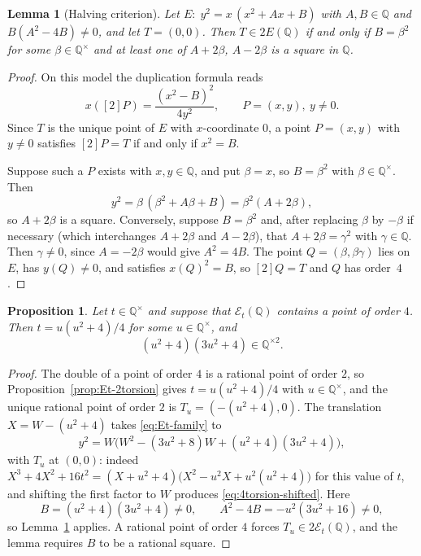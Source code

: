 \documentclass[11pt,a4paper]{amsart}
\newtheorem{proposition}[theorem]{Proposition}
\newtheorem{lemma}[theorem]{Lemma}
\theoremstyle{definition}
\theoremstyle{remark}
\numberwithin{equation}{section}
\newcommand{\Q}{\mathbb{Q}}
\newcommand{\mathcalE}{\mathcal{E}}
\begin{document}
\begin{lemma}[Halving criterion]\label{lem:halving}
Let $E:\;y^2=x\,(x^2+Ax+B)$ with $A,B\in\Q$ and $B(A^2-4B)\neq0$, and let $T=(0,0)$. Then $T\in2E(\Q)$ if and only if $B=\beta^2$ for some $\beta\in\Q^\times$ and at least one of $A+2\beta$, $A-2\beta$ is a square in $\Q$.
\end{lemma}

\begin{proof}
On this model the duplication formula reads
\[
x([2]P)=\frac{(x^2-B)^2}{4y^2},\qquad P=(x,y),\ y\neq0.
\]
Since $T$ is the unique point of $E$ with $x$-coordinate $0$, a point $P=(x,y)$ with $y\neq0$ satisfies $[2]P=T$ if and only if $x^2=B$.

Suppose such a $P$ exists with $x,y\in\Q$, and put $\beta=x$, so $B=\beta^2$ with $\beta\in\Q^\times$. Then
\[
y^2=\beta\,(\beta^2+A\beta+B)=\beta^2(A+2\beta),
\]
so $A+2\beta$ is a square. Conversely, suppose $B=\beta^2$ and, after replacing $\beta$ by $-\beta$ if necessary (which interchanges $A+2\beta$ and $A-2\beta$), that $A+2\beta=\gamma^2$ with $\gamma\in\Q$. Then $\gamma\neq0$, since $A=-2\beta$ would give $A^2=4B$. The point $Q=(\beta,\beta\gamma)$ lies on $E$, has $y(Q)\neq0$, and satisfies $x(Q)^2=B$, so $[2]Q=T$ and $Q$ has order~$4$.\hspace*{1em}
\end{proof}

\begin{proposition}\label{prop:4torsion-reduction}
Let $t\in\Q^\times$ and suppose that $\mathcalE_t(\Q)$ contains a point of order $4$. Then $t=u(u^2+4)/4$ for some $u\in\Q^\times$, and
\begin{equation}\label{eq:4torsion-B-square}
(u^2+4)(3u^2+4)\in\Q^{\times2}.
\end{equation}
\end{proposition}

\begin{proof}
The double of a point of order $4$ is a rational point of order $2$, so Proposition~\ref{prop:Et-2torsion} gives $t=u(u^2+4)/4$ with $u\in\Q^\times$, and the unique rational point of order $2$ is $T_u=(-(u^2+4),0)$. The translation $X=W-(u^2+4)$ takes \eqref{eq:Et-family} to
\begin{equation}\label{eq:4torsion-shifted}
y^2=W\bigl(W^2-(3u^2+8)W+(u^2+4)(3u^2+4)\bigr),
\end{equation}
with $T_u$ at $(0,0)$: indeed $X^3+4X^2+16t^2=(X+u^2+4)\bigl(X^2-u^2X+u^2(u^2+4)\bigr)$ for this value of $t$, and shifting the first factor to $W$ produces \eqref{eq:4torsion-shifted}. Here
\[
B=(u^2+4)(3u^2+4)\neq0,
\qquad A^2-4B=-u^2(3u^2+16)\neq0,
\]
so Lemma~\ref{lem:halving} applies. A rational point of order $4$ forces
$T_u\in2\mathcalE_t(\Q)$, and the lemma requires $B$ to be a rational square.
\end{proof}
\end{document}
